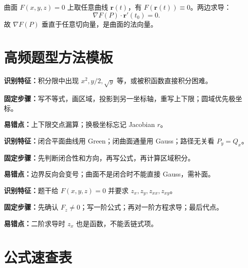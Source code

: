 \documentclass[UTF8,zihao=-4]{ctexart}
\newcommand{\ve}[1]{\bm{#1}}
\newcommand{\grad}{\nabla}
\begin{document}
\begin{methodbox}[梯度垂直切向量]
曲面 $F(x,y,z)=0$ 上取任意曲线 $\ve r(t)$，有 $F(\ve r(t))\equiv0$。两边求导：
\[
\grad F(P)\cdot \ve r'(t_0)=0.
\]
故 $\grad F(P)$ 垂直于任意切向量，是曲面的法向量。
\end{methodbox}

\section{高频题型方法模板}

\begin{methodbox}
\textbf{识别特征：}积分限中出现 $x^2,y/2,\sqrt y$ 等，或被积函数直接积分困难。\par
\textbf{固定步骤：}写不等式，画区域，投影到另一坐标轴，重写上下限；圆域优先极坐标。\par
\textbf{易错点：}上下限交点漏算；换极坐标忘记 Jacobian $r$。
\end{methodbox}

\begin{methodbox}
\textbf{识别特征：}闭合平面曲线用 Green；闭曲面通量用 Gauss；路径无关看 $P_y=Q_x$。\par
\textbf{固定步骤：}先判断闭合性和方向，再写公式，再计算区域积分。\par
\textbf{易错点：}边界反向会变号；曲面不是闭合时不能直接 Gauss，需补面。
\end{methodbox}

\begin{methodbox}
\textbf{识别特征：}题干给 $F(x,y,z)=0$ 并要求 $z_x,z_y,z_{xx},z_{xy}$。\par
\textbf{固定步骤：}先确认 $F_z\ne0$；写一阶公式；再对一阶方程求导；最后代点。\par
\textbf{易错点：}二阶求导时 $z_x$ 也是函数，不能丢链式项。
\end{methodbox}

\section{公式速查表}
\end{document}
